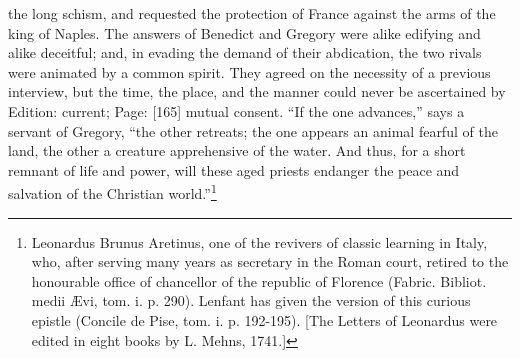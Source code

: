 the long schism, and requested the protection of France against the arms of the king of Naples. The answers of Benedict and Gregory were alike edifying and alike deceitful; and, in evading the demand of their abdication, the two rivals were animated by a common spirit. They agreed on the necessity of a previous interview, but the time, the place, and the manner could never be ascertained by Edition: current; Page: [165] mutual consent. \texthebrew{“}If the one advances,\texthebrew{}” says a servant of Gregory, \texthebrew{“}the other retreats; the one appears an animal fearful of the land, the other a creature apprehensive of the water. And thus, for a short remnant of life and power, will these aged priests endanger the peace and salvation of the Christian world.\texthebrew{}”\footnote{Leonardus Brunus Aretinus, one of the revivers of classic learning in Italy, who, after serving many years as secretary in the Roman court, retired to the honourable office of chancellor of the republic of Florence (Fabric. Bibliot. medii Ævi, tom. i. p. 290). Lenfant has given the version of this curious epistle (Concile de Pise, tom. i. p. 192-195). [The Letters of Leonardus were edited in eight books by L. Mehns, 1741.]}

